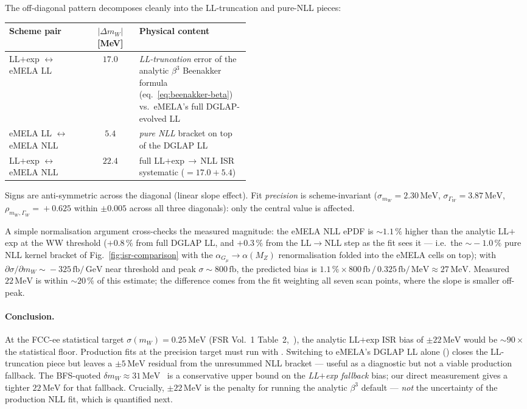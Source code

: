 \documentclass[11pt,a4paper]{article}
\newcommand{\code}[1]{\texttt{\detokenize{#1}}}
\newcommand{\mW}{m_W}
\newcommand{\GammaW}{\Gamma_W}
\newcommand{\fb}{\ensuremath{\,\mathrm{fb}}}
\newcommand{\GeV}{\ensuremath{\,\mathrm{GeV}}}
\newcommand{\MeV}{\ensuremath{\,\mathrm{MeV}}}
\begin{document}
The off-diagonal pattern decomposes cleanly into the LL-truncation and
pure-NLL pieces:
\begin{center}\small
\begin{tabular}{l c p{0.46\linewidth}}
\toprule
Scheme pair & $|\Delta\mW|$ [MeV] & Physical content \\
\midrule
LL$+$exp $\leftrightarrow$ eMELA LL
  & $17.0$ & \emph{LL-truncation} error of the analytic $\beta^3$ Beenakker
            formula (eq.~\eqref{eq:beenakker-beta}) vs.\ eMELA's full
            DGLAP-evolved LL \\
eMELA LL $\leftrightarrow$ eMELA NLL
  & $5.4$  & \emph{pure NLL} bracket on top of the DGLAP LL \\
\midrule
LL$+$exp $\leftrightarrow$ eMELA NLL
  & $22.4$ & full LL$+$exp\,$\to$\,NLL ISR systematic ($=17.0+5.4$) \\
\bottomrule
\end{tabular}
\end{center}
Signs are anti-symmetric across the diagonal (linear slope effect). Fit
\emph{precision} is scheme-invariant
($\sigma_{\mW}\!=\!2.30\MeV$, $\sigma_{\GammaW}\!=\!3.87\MeV$,
$\rho_{\mW,\GammaW}\!=\!+0.625$ within $\pm 0.005$ across all three
diagonals): only the central value is affected.

A simple normalisation argument cross-checks the measured magnitude:
the eMELA NLL ePDF is $\sim 1.1\,\%$ higher than the analytic LL$+$exp
at the WW threshold ($+0.8\,\%$ from full DGLAP LL, and $+0.3\,\%$ from
the LL$\to$NLL step as the fit sees it --- i.e.\ the $\sim\!-1.0\,\%$ pure
NLL kernel bracket of Fig.~\ref{fig:isr-comparison} with the
$\alpha_{G_\mu}\!\to\!\alpha(M_Z)$ renormalisation folded into the eMELA
cells on top); with $\partial\sigma/\partial\mW\!\sim\!-325\fb/\GeV$
near threshold and peak $\sigma\!\sim\!800\fb$, the predicted bias is
$1.1\,\%\times 800\fb \,/\, 0.325\fb/\MeV \approx 27\MeV$. Measured
$22\MeV$ is within $\sim 20\,\%$ of this estimate; the difference comes
from the fit weighting all seven scan points, where the slope is
smaller off-peak.

\paragraph{Conclusion.}
At the FCC-ee statistical target $\sigma(\mW)\!=\!0.25\MeV$ (FSR
Vol.~1 Table~2,~\cite{FCCFSR2025}), the analytic LL$+$exp ISR bias of
$\pm 22\MeV$ would be $\sim 90\times$ the statistical floor.
Production fits at the precision target must run with
\code{isr_nll=True}. Switching to eMELA's DGLAP LL alone
(\code{isr_emela_ll=True}) closes the LL-truncation piece but leaves
a $\pm 5\MeV$ residual from the unresummed NLL bracket --- useful as a
diagnostic but not a viable production fallback. The
BFS-quoted $\delta\mW\!\approx\!31\MeV$~\cite{BFSnlo} is a conservative
upper bound on the \emph{LL$+$exp fallback} bias; our direct measurement
gives a tighter $22\MeV$ for that fallback. Crucially, $\pm22\MeV$ is the
penalty for running the analytic $\beta^3$ default --- \emph{not} the
uncertainty of the production NLL fit, which is quantified next.
\end{document}
